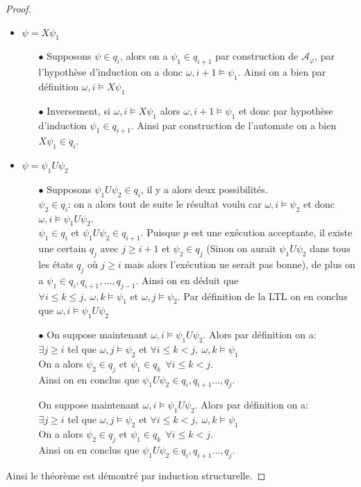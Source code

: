 \documentclass[12pt,a4paper]{article}
\theoremstyle{plain}
\theoremstyle{definition}
\begin{document}
\begin{proof}
\begin{itemize}
\begin{itemize}
 		\end{itemize}
		\item $\psi = X\psi_1$
		\begin{itemize}
			\item[$\bullet$] Supposons $\psi \in q_i$, alors on a $\psi_1 \in q_{i+1}$ par construction de $\mathcal{A}_\varphi$, par l'hypothèse d'induction on a donc $\omega, i+1 \models \psi_1$. Ainsi on a bien par définition $\omega, i \models X\psi_1$
			\item[$\bullet$] Inversement, si $\omega, i \models X\psi_1$ alors $\omega, i+1 \models \psi_1$ et donc par hypothèse d'induction $\psi_1 \in q_{i+1}$. Ainsi par construction de l'automate on a bien $X\psi_1 \in q_i$. 
		\end{itemize}
		\item $\psi = \psi_1 U \psi_2$
		\begin{itemize}
			\item[$\bullet$] Supposons $\psi_1 U \psi_2 \in q_i$, il y a alors deux possibilités.\\
				$\psi_2 \in q_i$: on a alors tout de suite le résultat voulu car $\omega, i \models \psi_2$ et donc $\omega, i \models \psi_1 U \psi_2$. \\
				$\psi_1 \in q_i$ et $\psi_1 U \psi_2 \in q_{i+1}$. Puisque $p$ est une exécution acceptante, il existe une certain $q_j$ avec $j \geq i+1$ et $\psi_2 \in q_j$ (Sinon on aurait $\psi_1 U \psi_2$ dans tous les états $q_j$ où $j \geq i$ mais alors l'exécution ne serait pas bonne), de plus on a $\psi_1 \in q_i,q_{i+1},\dots,q_{j-1}$. Ainsi on en déduit que $\forall i \leq k \leq j , \: \omega, k \models \psi_1 \textrm{ et } \omega, j \models \psi_2$. Par définition de la LTL on en conclus que $\omega, i \models \psi_1 U \psi_2$
			\item[$\bullet$] On suppose maintenant $\omega, i \models \psi_1 U \psi_2$. Alors par définition on a:\\
			$\exists j \geq i$ tel que $\omega, j \models \psi_2$ et $\forall i \leq k < j, \: \omega, k \models \psi_1$\\
			On a alors $\psi_2 \in q_j$ et $\psi_1 \in q_k \:\: \forall i \leq k < j$. \\
			Ainsi on en conclus que $\psi_1 U \psi_2 \in q_i, q_{i+1} \dots, q_j$.
			\item[] On suppose maintenant $\omega, i \models \psi_1 U \psi_2$. Alors par définition on a:\\
			$\exists j \geq i$ tel que $\omega, j \models \psi_2$ et $\forall i \leq k < j, \: \omega, k \models \psi_1$\\
			On a alors $\psi_2 \in q_j$ et $\psi_1 \in q_k \:\: \forall i \leq k < j$. \\
			Ainsi on en conclus que $\psi_1 U \psi_2 \in q_i, q_{i+1} \dots, q_j$.  
		\end{itemize}
	\end{itemize}
	Ainsi le théorème est démontré par induction structurelle.
\end{proof}
\end{document}
